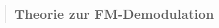 \begin{quote}
    \subsection{Theorie zur FM-Demodulation}
    \begin{quote}
        
    \end{quote}
    
    
\end{quote}



